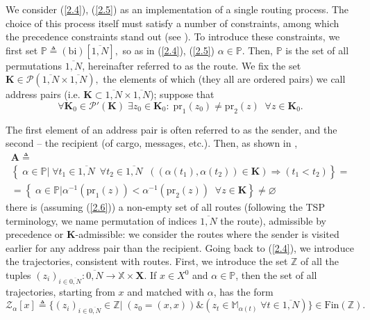 We consider
 (\ref{2.4}), (\ref{2.5})
as an implementation of a single routing process.
The choice of this process itself must satisfy
a number of constraints,
among which the precedence constraints stand out
(see \cite{10}).
To introduce these constraints,
we first set
$\mathbb{P} {\triangleq} (
  \mathrm{bi})[\overline{1,N}],$
so as in (\ref{2.4}), (\ref{2.5})
$\alpha \in \mathbb{P}$.
Then,
$\mathbb{P}$
is the set of all permutations
$\overline{1,N}$,
hereinafter referred to as the route.
We fix the set
$\mathbf{K} \in \mathcal{P}(\overline{1,N} \times \overline{1,N}),$
the elements of which
(they all are ordered pairs)
we call address pairs
(i.e. $\mathbf{K} \subset \overline{1,N} \times \overline{1,N}$);
suppose that
\begin{equation}\label{2.6}
\forall{\mathbf{K}_0} \in \mathcal{P}'(\mathbf{K})\;\exists{z_0} \in \mathbf{K}_0:\;\mathrm{pr}_1(z_0)
\ne \mathrm{pr}_2(z)\;\;\forall{z} \in \mathbf{K}_0.
\end{equation}

The first element of an address pair
is often referred to as the sender,
and the second -- the recipient
(of cargo, messages, etc.).
Then, as shown in \cite[part 2]{14},
\begin{multline}\label{2.7}
    \mathbf{A} {\triangleq} \\
    \left\{\;\alpha \in \mathbb{P} \vert\;
      \forall{t_1} \in \overline{1,N}\;\
      \forall{t_2}  \in \overline{1,N}\;\;
      ((\alpha(t_1),\alpha(t_2)) \in \mathbf{K})
      \Longrightarrow (t_1 < t_2)
    \right\} = \\
    =
    \left\{\;
      \alpha \in \mathbb{P} \vert
      \alpha^{-1}(\mathrm{pr}_1(z)) < \alpha^{-1}(\mathrm{pr}_2(z))\;\;\forall{z}
      \in \mathbf{K}
    \right\} \ne \varnothing
\end{multline}
there is
(assuming (\ref{2.6}))
a non-empty set of all routes
(following the TSP terminology,
we name permutation of indices $\overline {1, N}$
the route),
admissible by precedence or $\mathbf {K}$-admissible:
we consider the routes
where the sender is visited earlier for any address pair
than the recipient.
Going back to (\ref{2.4}),
we introduce the trajectories,
consistent with routes.
First, we introduce the set
$\mathbb{Z}$
of all the tuples
$(z_i)_{i \in \overline{0,N}}: \overline{0,N} \longrightarrow \mathbb{X} \times \mathbf{X}$.
If $x \in X^0$ and $\alpha \in \mathbb{P}$,
then
the set of all trajectories,
starting from $ x $
and matched with $\alpha $,
has the form
\begin{equation}\label{2.8}
\mathcal{Z}_\alpha[x] {\triangleq} \{(z_i)_{i \in \overline{0,N}}
\in \mathbb{Z} \vert\;(z_0 = (x,x)) \& (z_t \in \mathbb{M}_{\alpha(t)}\;\forall{t} \in \overline{1,N})\} \in \mathrm{Fin}(\mathbb{Z}).
\end{equation}

